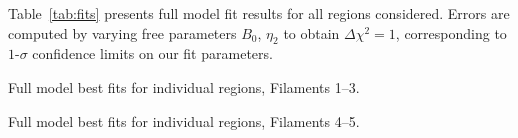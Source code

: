 \documentclass[iop, apj, numberedappendix, twocolappendix]{emulateapj}
\newcommand*{\mt}{\mathrm}
\newcommand*{\unit}[1]{\;\mt{#1}}  %
\newcommand*{\abt}{\mathord{\sim}} %
\begin{document}
Table~\ref{tab:fits} presents full model fit results for all regions
considered. Errors are computed by varying free parameters $B_0$,
$\eta_2$ to obtain $\Delta\chi^2 = 1$, corresponding to $1$-$\sigma$ confidence
limits on our fit parameters.

\begin{table*}[ht]
    \tiny
    \centering
    \caption{Full model best fits for individual regions, Filaments 1--3.
    \label{tab:fits}}
    
\end{table*}

\begin{table*}[ht]
    \tiny
    \centering
    \caption{Full model best fits for individual regions, Filaments 4--5.
    \label{tab:fits-pt2}}
    
\end{table*}


%
%    
\end{document}
